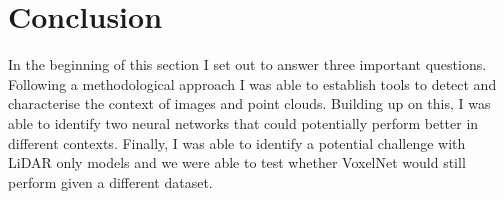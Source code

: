 \section{Conclusion}
In the beginning of this section I set out to answer three important questions. Following a methodological approach I was able to establish tools to detect and characterise the context of images and point clouds. Building up on this, I was able to identify two neural networks that could potentially perform better in different contexts. 
Finally, I was able to identify a potential challenge with LiDAR only models and we were able to test whether VoxelNet would still perform given a different dataset. 
